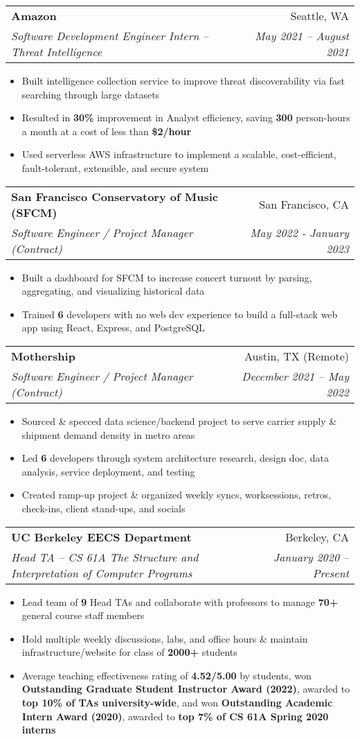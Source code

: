 \documentclass[letterpaper,11pt]{article}
\makeatletter
\newcommand{\resumeItem}[1]{
  \item\small{
    {#1 \vspace{-4pt}}
  }
}
\newcommand{\resumeSubheading}[4]{
  \vspace{-2pt}\item
    \begin{tabular*}{0.97\textwidth}[t]{l@{\extracolsep{\fill}}r}
      \textbf{#1} & #2 \\
      \textit{\small#3} & \textit{\small #4} \\
    \end{tabular*}\vspace{-8pt}
}
\newcommand{\resumeItemListStart}{\begin{itemize}[leftmargin=0.2in]}
\newcommand{\resumeItemListEnd}{\end{itemize}\vspace{-5pt}}
\makeatother
\begin{document}
\resumeSubheading
    {Amazon}{Seattle, WA}{Software Development Engineer Intern – Threat Intelligence}{May 2021 – August 2021}
    \resumeItemListStart
        \resumeItem{Built intelligence collection service to improve threat discoverability via fast searching through large datasets}
        \resumeItem{Resulted in \textbf{30\%} improvement in Analyst efficiency, saving \textbf{300} person-hours a month at a cost of less than \textbf{\$2/hour}}
        \resumeItem{Used serverless AWS infrastructure to implement a scalable, cost-efficient, fault-tolerant, extensible, and secure system}
    \resumeItemListEnd

\resumeSubheading
    {San Francisco Conservatory of Music {\normalfont (SFCM)}}{San Francisco, CA}{Software Engineer / Project Manager (Contract)}{May 2022 - January 2023}
    \resumeItemListStart
        \resumeItem{Built a dashboard for SFCM to increase concert turnout by parsing, aggregating, and visualizing historical data}
        \resumeItem{Trained \textbf{6} developers with no web dev experience to build a full-stack web app using React, Express, and PostgreSQL}
    \resumeItemListEnd

\resumeSubheading
    {Mothership}{Austin, TX (Remote)}{Software Engineer / Project Manager (Contract)}{December 2021 – May 2022}
    \resumeItemListStart
        \resumeItem{Sourced \& specced data science/backend project to serve carrier supply \& shipment demand density in metro areas}
        \resumeItem{Led \textbf{6} developers through system architecture research, design doc, data analysis, service deployment, and testing}
        \resumeItem{Created ramp-up project \& organized weekly syncs, worksessions, retros, check-ins, client stand-ups, and socials}
    \resumeItemListEnd

\resumeSubheading
    {UC Berkeley EECS Department}{Berkeley, CA}{Head TA – CS 61A The Structure and Interpretation of Computer Programs}{January 2020 – Present}
    \resumeItemListStart
        \resumeItem{Lead team of \textbf{9} Head TAs and collaborate with professors to manage \textbf{70+} general course staff members}
        \resumeItem{Hold multiple weekly discussions, labs, and office hours \& maintain infrastructure/website for class of \textbf{2000+} students}
        \resumeItem{Average teaching effectiveness rating of \textbf{4.52/5.00} by students, won \textbf{Outstanding Graduate Student Instructor Award (2022)}, awarded to \textbf{top 10\% of TAs university-wide}, and won \textbf{Outstanding Academic Intern Award (2020)}, awarded to \textbf{top 7\% of CS 61A Spring 2020 interns}}
    \resumeItemListEnd
\end{document}
